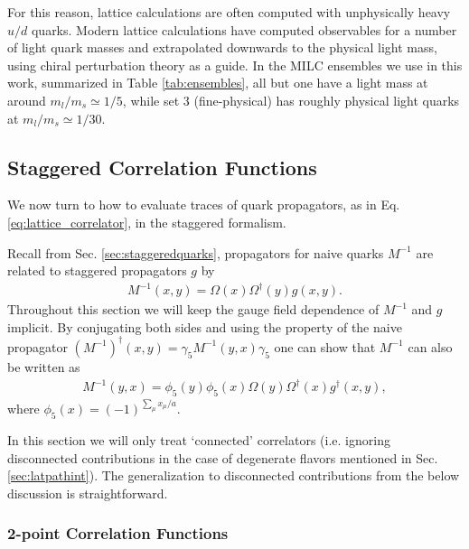 For this reason, lattice calculations are often computed with unphysically heavy $u/d$ quarks. Modern lattice calculations have computed observables for a number of light quark masses and extrapolated downwards to the physical light mass, using chiral perturbation theory as a guide. In the MILC ensembles we use in this work, summarized in Table \ref{tab:ensembles}, all but one have a light mass at around $m_l/m_s \simeq 1/5$, while set 3 (fine-physical) has roughly physical light quarks at $m_l/m_s \simeq 1/30$.


\subsection{Staggered Correlation Functions}
\label{sec:staggeredcorrelators}

We now turn to how to evaluate traces of quark propagators, as in Eq. \eqref{eq:lattice_correlator}, in the staggered formalism. %

Recall from Sec. \ref{sec:staggeredquarks}, propagators for naive quarks $M^{-1}$ are related to staggered propagators $g$ by
\begin{align}
  M^{-1}(x,y) = \Omega(x)\Omega^{\dagger}(y) g(x,y).
\end{align}
Throughout this section we will keep the gauge field dependence of $M^{-1}$ and $g$ implicit. By conjugating both sides and using the property of the naive propagator $(M^{-1})^{\dagger}(x,y) = \gamma_5 M^{-1}(y,x)\gamma_5$ one can show that $M^{-1}$ can also be written as
\begin{align}
  \label{eq:Gconj}
  M^{-1}(y,x) = \phi_5(y)\phi_5(x) \Omega(y)\Omega^{\dagger}(x) g^{\dagger}(x,y),
\end{align}
where $\phi_5(x) = (-1)^{\sum_{\mu} x_{\mu}/a}$.

In this section we will only treat `connected' correlators (i.e. ignoring disconnected contributions in the case of degenerate flavors mentioned in Sec. \ref{sec:latpathint}). The generalization to disconnected contributions from the below discussion is straightforward.

\subsubsection{2-point Correlation Functions}

